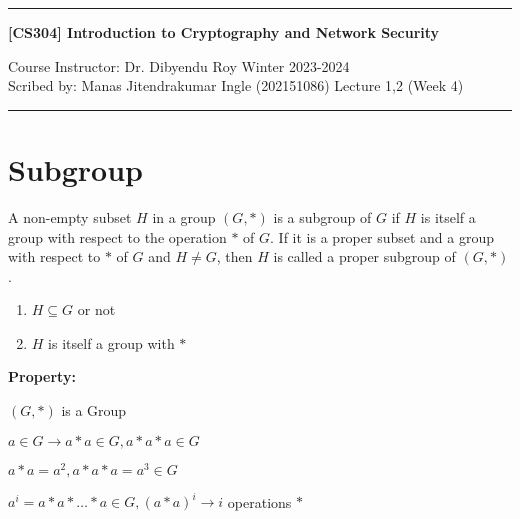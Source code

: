 \documentclass[11pt]{article}
\begin{document}
\noindent
\rule{\textwidth}{1pt}
\begin{center}
{\bf [CS304] Introduction to Cryptography and Network Security}
\end{center}
Course Instructor: Dr. Dibyendu Roy \hfill Winter 2023-2024\\
Scribed by: Manas Jitendrakumar Ingle (202151086) \hfill Lecture 1,2 (Week 4)
\\
\rule{\textwidth}{1pt}

\section{Subgroup}

A non-empty subset $H$ in a group $(G, *)$ is a subgroup of $G$ if $H$ is itself a group with respect to the operation $*$ of $G$. If it is a proper subset and a group with respect to $*$ of $G$ and $H \neq G$, then $H$ is called a proper subgroup of $(G, *)$.

\begin{enumerate}
    \item $H \subseteq G$ or not
    \item $H$ is itself a group with $*$
\end{enumerate}

\textbf{Property:}

$(G, *)$ is a Group

$a \in G \rightarrow a * a \in G, a * a * a \in G$

$a * a = a^2, a * a * a = a^3 \in G$

$a^i = a * a * \ldots * a \in G, (a * a)^i \rightarrow i$ operations $*$
\end{document}
